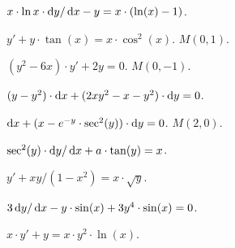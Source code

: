 \begin{problem}
	$x \cdot \ln x \cdot \mathop{}\!\mathrm{d} y / \mathop{}\!\mathrm{d} x - y = x \cdot (\ln (x) - 1)$.
\end{problem}

\begin{problem}
	$y' + y \cdot \tan (x) = x \cdot \cos^2 (x)$.  $M(0, 1)$.
\end{problem}

\begin{problem}
	$(y^2 - 6 x) \cdot y' + 2 y = 0$.  $M(0, -1)$.
\end{problem}

\begin{problem}
	$(y - y^2) \cdot \mathop{}\!\mathrm{d} x + (2 x y^2 - x - y^2) \cdot \mathop{}\!\mathrm{d} y = 0$.
\end{problem}

\begin{problem}
	$\mathop{}\!\mathrm{d} x + (x - e^{-y} \cdot \sec^2 (y)) \cdot \mathop{}\!\mathrm{d} y = 0$.  $M(2, 0)$.
\end{problem}

\begin{problem}
	$\sec^2 (y) \cdot \mathop{}\!\mathrm{d} y / \mathop{}\!\mathrm{d} x + a \cdot \tan (y) = x$.
\end{problem}

\begin{problem}
	$y' + x y / (1 - x^2) = x \cdot \sqrt{y}$.
\end{problem}

\begin{problem}
	$3 \mathop{}\!\mathrm{d} y / \mathop{}\!\mathrm{d} x - y \cdot \sin (x) + 3 y^4 \cdot \sin (x) = 0$.
\end{problem}

\begin{problem}
	$x \cdot y' + y = x \cdot y^2 \cdot \ln (x)$.
\end{problem}
